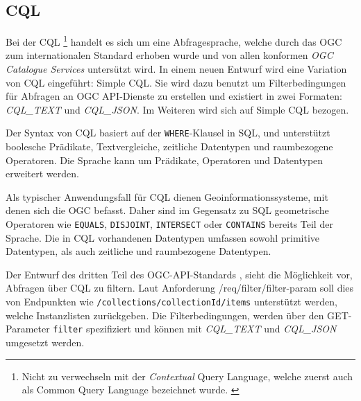 \subsection{\acl{CQL}}


Bei der \acf{CQL} \footnote{Nicht zu verwechseln mit der \textit{Contextual} Query Language, welche zuerst auch als Common Query Language bezeichnet wurde. \parencite{thelibraryofcongressCQLContextual2023, ZINGGentle2003}} handelt es sich um eine Abfragesprache, welche durch das \ac{OGC} zum internationalen Standard erhoben wurde und von allen konformen \textit{\ac{OGC} Catalogue Services} untersützt wird.  In einem neuen Entwurf  wird eine Variation von \ac{CQL} eingeführt: Simple \ac{CQL}. Sie wird dazu benutzt um Filterbedingungen für Abfragen an \ac{OGC} API-Dienste zu erstellen und existiert in zwei Formaten: \textit{CQL\_TEXT} und \textit{CQL\_JSON}.  Im Weiteren wird sich auf Simple \ac{CQL} bezogen.

Der Syntax von \ac{CQL} basiert auf der \texttt{WHERE}-Klausel in \acs{SQL}, und unterstützt boolesche Prädikate, Textvergleiche, zeitliche Datentypen und raumbezogene Operatoren. Die Sprache kann um Prädikate, Operatoren und Datentypen erweitert werden.

Als typischer Anwendungsfall für \ac{CQL} dienen Geoinformationssysteme, mit denen sich die \ac{OGC} befasst. Daher sind im Gegensatz zu \ac{SQL} geometrische Operatoren wie \texttt{EQUALS}, \texttt{DISJOINT}, \texttt{INTERSECT} oder \texttt{CONTAINS} bereits Teil der Sprache. Die in \ac{CQL} vorhandenen Datentypen umfassen sowohl primitive Datentypen, als auch zeitliche und raumbezogene Datentypen.

Der Entwurf des dritten Teil des OGC-API-Standards , sieht die Möglichkeit vor, Abfragen über \ac{CQL} zu filtern. Laut Anforderung /req/filter/filter-param soll dies von Endpunkten wie \texttt{/collections/{collectionId}/items} unterstützt werden, welche Instanzlisten zurückgeben. Die Filterbedingungen, werden über den GET-Parameter \texttt{filter} spezifiziert und können mit \textit{CQL\_TEXT} und \textit{CQL\_JSON} umgesetzt werden.

